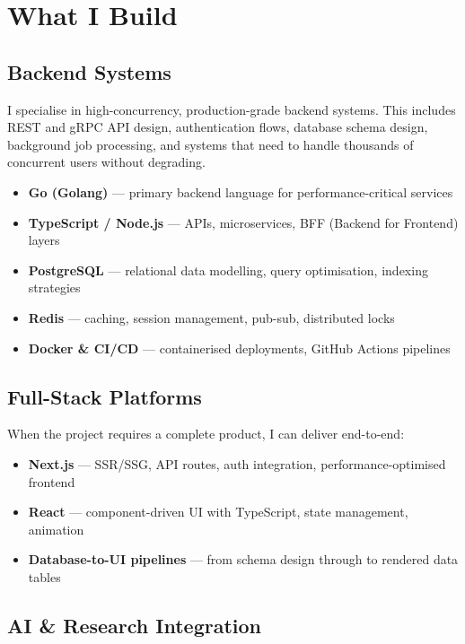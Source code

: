 \documentclass[11pt,a4paper]{article}
\begin{document}
\section{What I Build}

\subsection{Backend Systems}

I specialise in high-concurrency, production-grade backend systems. This includes REST and gRPC API design, authentication flows, database schema design, background job processing, and systems that need to handle thousands of concurrent users without degrading.

\begin{itemize}
  \item \textbf{Go (Golang)} — primary backend language for performance-critical services
  \item \textbf{TypeScript / Node.js} — APIs, microservices, BFF (Backend for Frontend) layers
  \item \textbf{PostgreSQL} — relational data modelling, query optimisation, indexing strategies
  \item \textbf{Redis} — caching, session management, pub-sub, distributed locks
  \item \textbf{Docker \& CI/CD} — containerised deployments, GitHub Actions pipelines
\end{itemize}

\subsection{Full-Stack Platforms}

When the project requires a complete product, I can deliver end-to-end:

\begin{itemize}
  \item \textbf{Next.js} — SSR/SSG, API routes, auth integration, performance-optimised frontend
  \item \textbf{React} — component-driven UI with TypeScript, state management, animation
  \item \textbf{Database-to-UI pipelines} — from schema design through to rendered data tables
\end{itemize}

\subsection{AI \& Research Integration}
\end{document}
